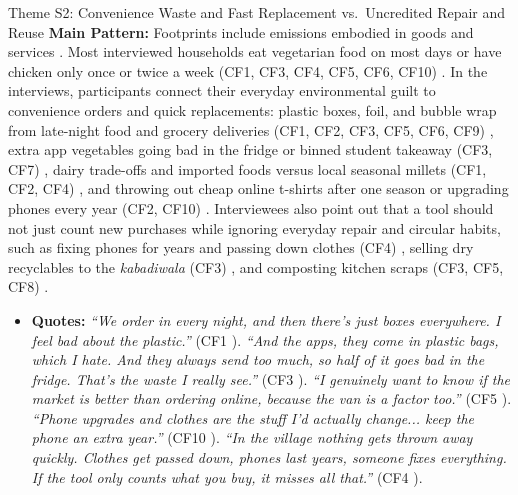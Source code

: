 \documentclass[12pt, a4paper]{article}
\begin{document}
\begin{semanticcard}{Theme S2: Convenience Waste and Fast Replacement vs.\ Uncredited Repair and Reuse}
\textbf{Main Pattern:} Footprints include emissions embodied in goods and services \cite{shi2021}. Most interviewed households eat vegetarian food on most days or have chicken only once or twice a week (CF1, CF3, CF4, CF5, CF6, CF10) \cite{cf1, cf3, cf4, cf5, cf6, cf10}. In the interviews, participants connect their everyday environmental guilt to convenience orders and quick replacements: plastic boxes, foil, and bubble wrap from late-night food and grocery deliveries (CF1, CF2, CF3, CF5, CF6, CF9) \cite{cf1, cf2, cf3, cf5, cf6, cf9}, extra app vegetables going bad in the fridge or binned student takeaway (CF3, CF7) \cite{cf3, cf7}, dairy trade-offs and imported foods versus local seasonal millets (CF1, CF2, CF4) \cite{cf1, cf2, cf4}, and throwing out cheap online t-shirts after one season or upgrading phones every year (CF2, CF10) \cite{cf2, cf10}. Interviewees also point out that a tool should not just count new purchases while ignoring everyday repair and circular habits, such as fixing phones for years and passing down clothes (CF4) \cite{cf4}, selling dry recyclables to the \textit{kabadiwala} (CF3) \cite{cf3}, and composting kitchen scraps (CF3, CF5, CF8) \cite{cf3, cf5, cf8}.
\begin{itemize}
    \item \textbf{Quotes:} \textit{``We order in every night, and then there's just boxes everywhere. I feel bad about the plastic.''} (CF1 \cite{cf1}). \textit{``And the apps, they come in plastic bags, which I hate. And they always send too much, so half of it goes bad in the fridge. That's the waste I really see.''} (CF3 \cite{cf3}). \textit{``I genuinely want to know if the market is better than ordering online, because the van is a factor too.''} (CF5 \cite{cf5}). \textit{``Phone upgrades and clothes are the stuff I'd actually change... keep the phone an extra year.''} (CF10 \cite{cf10}). \textit{``In the village nothing gets thrown away quickly. Clothes get passed down, phones last years, someone fixes everything. If the tool only counts what you buy, it misses all that.''} (CF4 \cite{cf4}).
\end{itemize}
\end{semanticcard}
\end{document}
